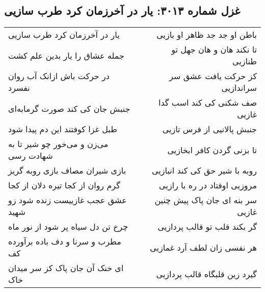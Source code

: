 \begin{center}
\section*{غزل شماره ۳۰۱۳: یار در آخرزمان کرد طرب سازیی}
\label{sec:3013}
\begin{longtable}{l p{0.5cm} r}
یار در آخرزمان کرد طرب سازیی
&&
باطن او جد جد ظاهر او بازیی
\\
جمله عشاق را یار بدین علم کشت
&&
تا نکند هان و هان جهل تو طنازیی
\\
در حرکت باش ازانک آب روان نفسرد
&&
کز حرکت یافت عشق سر سراندازیی
\\
جنبش جان کی کند صورت گرمابه‌ای
&&
صف شکنی کی کند اسب گدا غازیی
\\
طبل غزا کوفتند این دم پیدا شود
&&
جنبش پالانیی از فرس تازیی
\\
می‌زن و می‌خور چو شیر تا به شهادت رسی
&&
تا بزنی گردن کافر ابخازیی
\\
بازی شیران مصاف بازی روبه گریز
&&
روبه با شیر حق کی کند انبازیی
\\
گرم روان از کجا تیره دلان از کجا
&&
مروزیی اوفتاد در ره با رازیی
\\
عشق عجب غازییست زنده شود زو شهید
&&
سر بنه ای جان پاک پیش چنین غازیی
\\
چرخ تن دل سیاه پر شود از نور ماه
&&
گر بکند قلب تو قالب پردازیی
\\
مطرب و سرنا و دف باده برآورده کف
&&
هر نفسی زان لطف آرد غمازیی
\\
ای خنک آن جان پاک کز سر میدان خاک
&&
گیرد زین قلبگاه قالب پردازیی
\\
\end{longtable}
\end{center}
